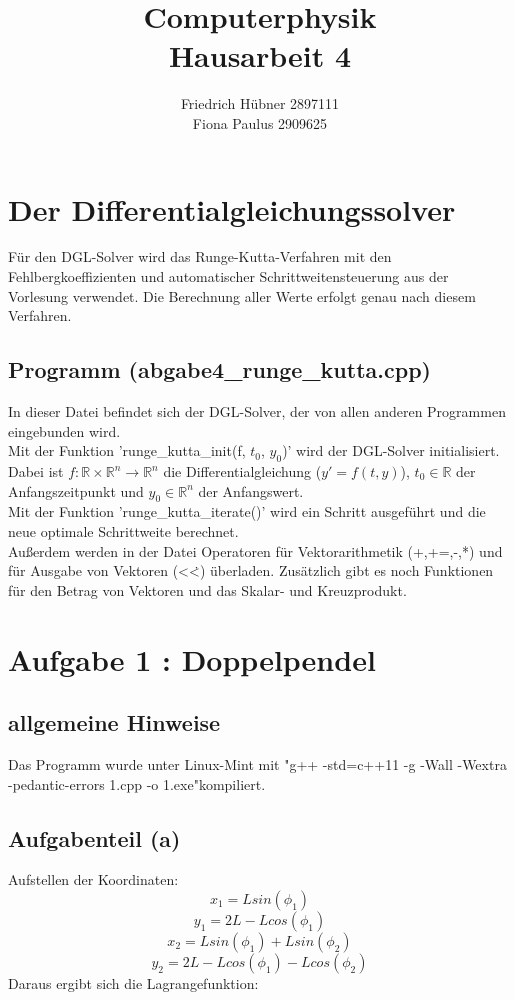 \documentclass{scrreprt}
\author{Friedrich Hübner 2897111\\
Fiona Paulus 2909625}
\title{Computerphysik\\Hausarbeit 4}
\begin{document}
\maketitle
\newpage

\chapter*{Der Differentialgleichungssolver}
Für den DGL-Solver wird das Runge-Kutta-Verfahren mit den Fehlbergkoeffizienten und automatischer Schrittweitensteuerung aus der Vorlesung verwendet. Die Berechnung aller Werte erfolgt genau nach diesem Verfahren.

\section*{Programm (abgabe4\_runge\_kutta.cpp)}
In dieser Datei befindet sich der DGL-Solver, der von allen anderen Programmen eingebunden wird.\\

Mit der Funktion 'runge\_kutta\_init(f, $t_0$, $y_0$)' wird der DGL-Solver initialisiert. Dabei ist $f: \mathbb{R} \times \mathbb{R}^n \to \mathbb{R}^n$ die Differentialgleichung ($y' = f(t,y)$), $t_0 \in \mathbb{R}$ der Anfangszeitpunkt und $y_0 \in \mathbb{R}^n$ der Anfangswert.\\

Mit der Funktion 'runge\_kutta\_iterate()' wird ein Schritt ausgeführt und die neue optimale Schrittweite berechnet.\\

Außerdem werden in der Datei Operatoren für Vektorarithmetik (+,+=,-,*) und für Ausgabe von Vektoren (<\.<) überladen. Zusätzlich gibt es noch Funktionen für den Betrag von Vektoren und das Skalar- und Kreuzprodukt.  

\chapter*{Aufgabe 1 : Doppelpendel}
\section*{allgemeine Hinweise}
Das Programm wurde unter Linux-Mint mit "g++ -std=c++11 -g -Wall -Wextra -pedantic-errors 1.cpp -o 1.exe"\;kompiliert.
\section*{Aufgabenteil (a)}
Aufstellen der Koordinaten:
\[x_1 = L sin(\phi_1)\]
\[y_1 = 2L - Lcos(\phi_1)\]
\[x_2 = L sin(\phi_1)+ L sin(\phi_2)\]
\[y_2 = 2L - L cos(\phi_1) - L cos(\phi_2)\] 
Daraus ergibt sich die Lagrangefunktion:
\end{document}
